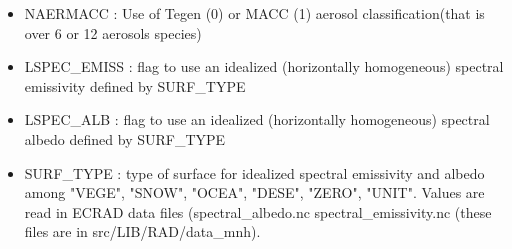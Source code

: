 \begin{itemize}
\item NAERMACC :  Use of Tegen (0) or MACC (1) aerosol classification(that is over 6 or 12 aerosols species)
 
 \item LSPEC\_EMISS : flag to use an idealized (horizontally homogeneous) spectral emissivity defined by SURF\_TYPE
 
  \item LSPEC\_ALB : flag to use an idealized (horizontally homogeneous) spectral albedo defined by SURF\_TYPE
 
   \item SURF\_TYPE : type of surface for idealized spectral emissivity and albedo among  "VEGE", "SNOW", "OCEA", "DESE", "ZERO", "UNIT". Values are read in ECRAD data files (spectral\_albedo.nc spectral\_emissivity.nc (these files are in src/LIB/RAD/data\_mnh). 
\end{itemize}
\newpage

